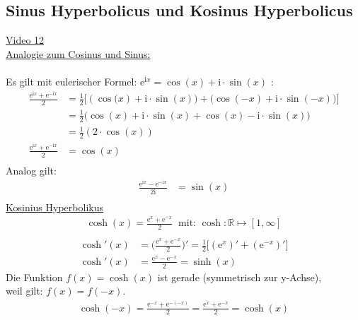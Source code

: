 \subsection{Sinus Hyperbolicus und Kosinus Hyperbolicus}
\href{https://youtu.be/FTkh0mVQCD0}{Video 12}\\
\underline{Analogie zum Cosinus und Sinus:}\\
\\
Es gilt mit eulerischer Formel: $ \mathrm{e}^{\mathrm{i}x}=\cos(x)+\mathrm{i}\cdot \sin(x) $ :\\
\begin{align*}
\frac{\mathrm{e}^{\mathrm{i}x}+\mathrm{e}^{-\mathrm{i}x}}{2}&=\frac{1}{2}\bigg[(\cos\big(x)+\mathrm{i}\cdot \sin(x)\big)+\big(\cos(-x)+\mathrm{i}\cdot \sin(-x)\big)\bigg]\\
&=\frac{1}{2}\big(\cos(x)+\mathrm{i}\cdot \sin(x)+\cos(x)-\mathrm{i}\cdot \sin(x)\big)\\
&=\frac{1}{2}(2\cdot \cos(x))\\
\frac{\mathrm{e}^{\mathrm{i}x}+\mathrm{e}^{-\mathrm{i}x}}{2}&=\cos(x)\\
\end{align*}
Analog gilt:\\
\begin{align*}
\frac{\mathrm{e}^{\mathrm{i}x}-\mathrm{e}^{-\mathrm{i}x}}{2\mathrm{i}}&=\sin(x)\\
\end{align*}
\underline {Kosinius Hyperbolikus}\\
\begin{align*}
\cosh(x)=\frac{\mathrm{e}^x+\mathrm{e}^{-x}}{2}\;\;\text{mit: } \cosh:\mathbb{R}\longmapsto[1,\infty]\\
\end{align*}
\begin{align*}
\cosh'(x)&=\bigg(\frac{\mathrm{e}^x+\mathrm{e}^{-x}}{2}\bigg)'=\frac{1}{2}\bigg[(\mathrm{e}^x)'+(\mathrm{e}^{-x})'\bigg]\\
\cosh'(x)&=\frac{\mathrm{e}^x-\mathrm{e}^{-x}}{2}=\sinh(x)
\end{align*}
Die Funktion $f(x) =\cosh(x) $ ist gerade (symmetrisch zur y-Achse),\\ weil gilt: $ f(x)=f(-x) $.\\
\begin{align*}
\cosh(-x)=\frac{\mathrm{e}^{-x}+\mathrm{e}^{-(-x)}}{2}=\frac{\mathrm{e}^x+\mathrm{e}^{-x}}{2}=\cosh(x)\\
\end{align*}
